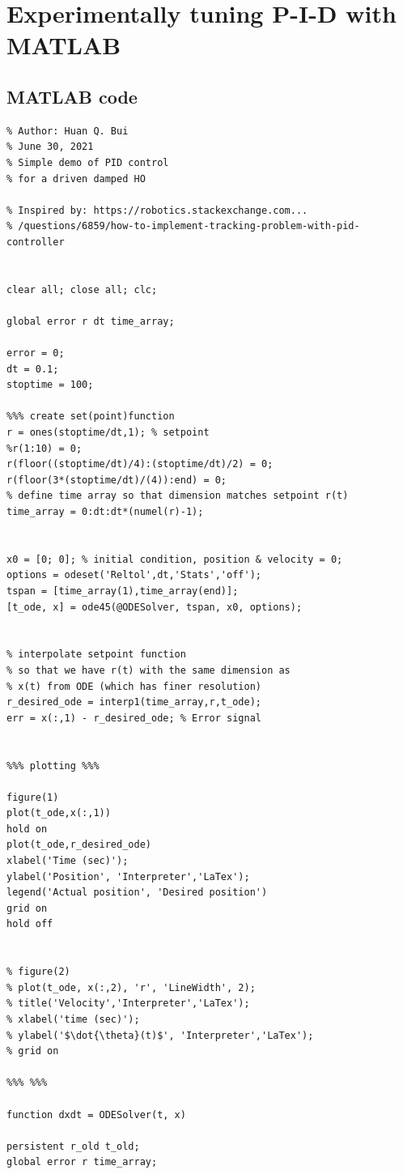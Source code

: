 \documentclass{article}
\theoremstyle{definition}
\begin{document}
\section{Experimentally tuning P-I-D with MATLAB}



\subsection{MATLAB code}

\begin{lstlisting}
% Author: Huan Q. Bui
% June 30, 2021
% Simple demo of PID control 
% for a driven damped HO

% Inspired by: https://robotics.stackexchange.com...
% /questions/6859/how-to-implement-tracking-problem-with-pid-controller


clear all; close all; clc;

global error r dt time_array;

error = 0;
dt = 0.1;
stoptime = 100;

%%% create set(point)function
r = ones(stoptime/dt,1); % setpoint
%r(1:10) = 0;
r(floor((stoptime/dt)/4):(stoptime/dt)/2) = 0;
r(floor(3*(stoptime/dt)/(4)):end) = 0;
% define time array so that dimension matches setpoint r(t)
time_array = 0:dt:dt*(numel(r)-1);


x0 = [0; 0]; % initial condition, position & velocity = 0;
options = odeset('Reltol',dt,'Stats','off');
tspan = [time_array(1),time_array(end)];
[t_ode, x] = ode45(@ODESolver, tspan, x0, options);


% interpolate setpoint function 
% so that we have r(t) with the same dimension as 
% x(t) from ODE (which has finer resolution)
r_desired_ode = interp1(time_array,r,t_ode);
err = x(:,1) - r_desired_ode; % Error signal


%%% plotting %%%

figure(1)
plot(t_ode,x(:,1))
hold on 
plot(t_ode,r_desired_ode)
xlabel('Time (sec)');
ylabel('Position', 'Interpreter','LaTex');
legend('Actual position', 'Desired position')
grid on
hold off


% figure(2)
% plot(t_ode, x(:,2), 'r', 'LineWidth', 2);
% title('Velocity','Interpreter','LaTex');
% xlabel('time (sec)');
% ylabel('$\dot{\theta}(t)$', 'Interpreter','LaTex');
% grid on

%%% %%%

function dxdt = ODESolver(t, x)

persistent r_old t_old;
global error r time_array;


\end{lstlisting}
\end{document}
